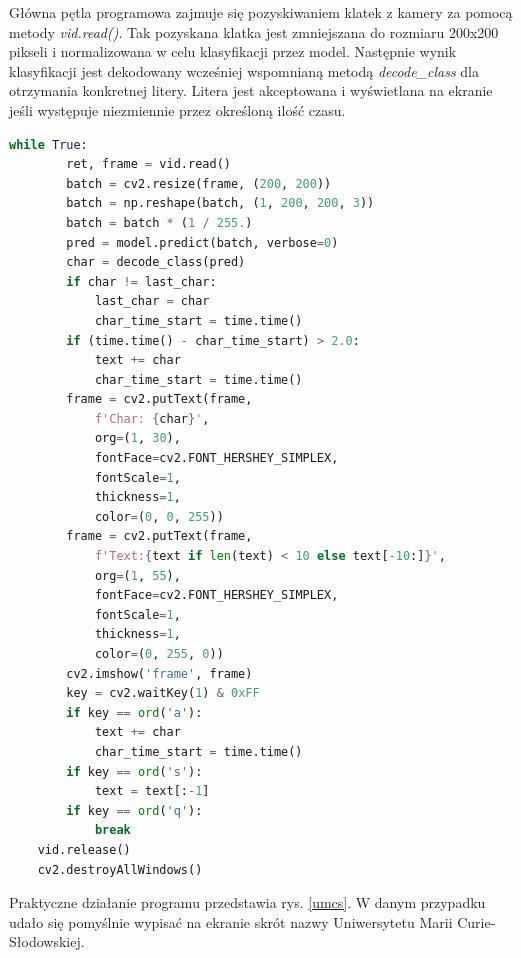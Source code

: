 \documentclass[a4paper,12pt,oneside]{book} %
\begin{document}
Główna pętla programowa zajmuje się pozyskiwaniem klatek z kamery za pomocą metody \emph{vid.read()}. Tak pozyskana klatka jest zmniejszana do rozmiaru 200x200 pikseli i normalizowana w celu klasyfikacji przez model. Następnie wynik klasyfikacji jest dekodowany wcześniej wspomnianą metodą \emph{decode\_class} dla otrzymania konkretnej litery. Litera jest akceptowana i wyświetlana na ekranie jeśli występuje niezmiennie przez określoną ilość czasu.

\begin{lstlisting}[language=Python, caption={Pętla programowa}, label={lst:apploop}]
	while True:
		ret, frame = vid.read()
		batch = cv2.resize(frame, (200, 200))
		batch = np.reshape(batch, (1, 200, 200, 3))
		batch = batch * (1 / 255.)
		pred = model.predict(batch, verbose=0)
		char = decode_class(pred)
		if char != last_char:
			last_char = char
			char_time_start = time.time()
		if (time.time() - char_time_start) > 2.0:
			text += char
			char_time_start = time.time()
		frame = cv2.putText(frame,
			f'Char: {char}',
			org=(1, 30),
			fontFace=cv2.FONT_HERSHEY_SIMPLEX,
			fontScale=1,
			thickness=1,
			color=(0, 0, 255))
		frame = cv2.putText(frame,
			f'Text:{text if len(text) < 10 else text[-10:]}',
			org=(1, 55),
			fontFace=cv2.FONT_HERSHEY_SIMPLEX,
			fontScale=1,
			thickness=1,
			color=(0, 255, 0))
		cv2.imshow('frame', frame)
		key = cv2.waitKey(1) & 0xFF
		if key == ord('a'):
			text += char
			char_time_start = time.time()
		if key == ord('s'):
			text = text[:-1]
		if key == ord('q'):
			break
	vid.release()
	cv2.destroyAllWindows()
\end{lstlisting}

Praktyczne działanie programu przedstawia rys. \ref{umcs}. W danym przypadku udało się pomyślnie wypisać na ekranie skrót nazwy Uniwersytetu Marii Curie-Słodowskiej.
\end{document}
